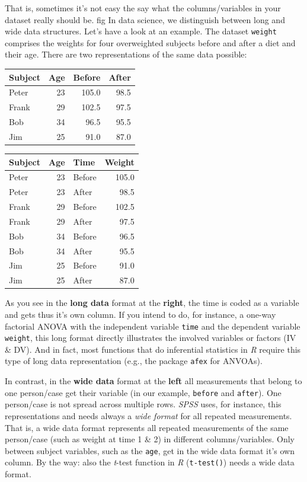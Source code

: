 \documentclass[
]{scrartcl}
\begin{document}
That is, sometimes it's not easy the say what the columns/variables in your dataset really should be.
fig
In data science, we distinguish between long and wide data structures. Let's have a look at an example. The dataset \texttt{weight} comprises the weights for four overweighted subjects before and after a diet and their age. There are two representations of the same data possible:

\begin{table}
\caption{\label{tab:longwide} The same tidy data structures in a wide (left) or long (right) format.}

\begin{longtable}[t]{lrrr}
\toprule
Subject & Age & Before & After\\
\midrule
Peter & 23 & 105.0 & 98.5\\
Frank & 29 & 102.5 & 97.5\\
Bob & 34 & 96.5 & 95.5\\
Jim & 25 & 91.0 & 87.0\\
\bottomrule
\end{longtable}
\begin{longtable}[t]{lrlr}
\toprule
Subject & Age & Time & Weight\\
\midrule
Peter & 23 & Before & 105.0\\
Peter & 23 & After & 98.5\\
Frank & 29 & Before & 102.5\\
Frank & 29 & After & 97.5\\
Bob & 34 & Before & 96.5\\
\addlinespace
Bob & 34 & After & 95.5\\
Jim & 25 & Before & 91.0\\
Jim & 25 & After & 87.0\\
\bottomrule
\end{longtable}
\end{table}

As you see in the \textbf{long data} format at the \textbf{right}, the time is coded as a variable and gets thus it's own column. If you intend to do, for instance, a one-way factorial ANOVA with the independent variable \texttt{time} and the dependent variable \texttt{weight}, this long format directly illustrates the involved variables or factors (IV \& DV). And in fact, most functions that do inferential statistics in \emph{R} require this type of long data representation (e.g., the package \texttt{afex} for ANVOAs).

In contrast, in the \textbf{wide data} format at the \textbf{left} all measurements that belong to one person/case get their variable (in our example, \texttt{before} and \texttt{after}). One person/case is not spread across multiple rows. \emph{SPSS} uses, for instance, this representations and needs always a \emph{wide format} for all repeated measurements. That is, a wide data format represents all repeated measurements of the same person/case (such as weight at time 1 \& 2) in different columns/variables. Only between subject variables, such as the \texttt{age}, get in the wide data format it's own column. By the way: also the \emph{t}-test function in \emph{R} (\texttt{t-test()}) needs a wide data format.
\end{document}
